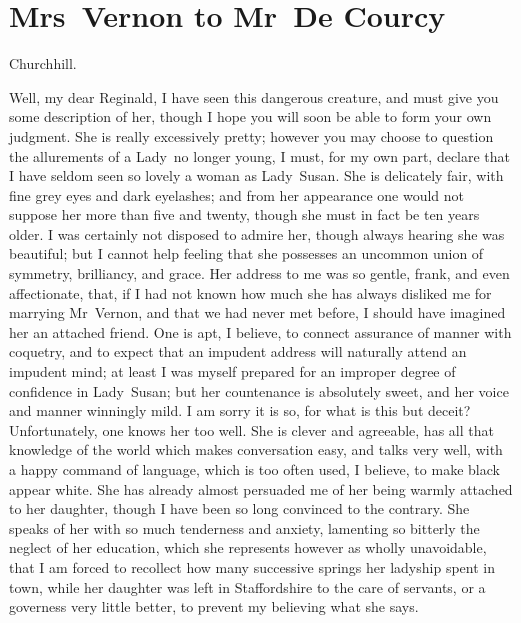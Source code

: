 \chapter{Mrs~Vernon to Mr~De Courcy}
  
  \begin{mail}{Churchhill.}{}

Well, my dear Reginald, I have seen this dangerous creature, and must give you some description of her, though I hope you will soon be able to form your own judgment. She is really excessively pretty; however you may choose to question the allurements of a Lady~no longer young, I must, for my own part, declare that I have seldom seen so lovely a woman as Lady~Susan. She is delicately fair, with fine grey eyes and dark eyelashes; and from her appearance one would not suppose her more than five and twenty, though she must in fact be ten years older. I was certainly not disposed to admire her, though always hearing she was beautiful; but I cannot help feeling that she possesses an uncommon union of symmetry, brilliancy, and grace. Her address to me was so gentle, frank, and even affectionate, that, if I had not known how much she has always disliked me for marrying Mr~Vernon, and that we had never met before, I should have imagined her an attached friend. One is apt, I believe, to connect assurance of manner with coquetry, and to expect that an impudent address will naturally attend an impudent mind; at least I was myself prepared for an improper degree of confidence in Lady~Susan; but her countenance is absolutely sweet, and her voice and manner winningly mild. I am sorry it is so, for what is this but deceit? Unfortunately, one knows her too well. She is clever and agreeable, has all that knowledge of the world which makes conversation easy, and talks very well, with a happy command of language, which is too often used, I believe, to make black appear white. She has already almost persuaded me of her being warmly attached to her daughter, though I have been so long convinced to the contrary. She speaks of her with so much tenderness and anxiety, lamenting so bitterly the neglect of her education, which she represents however as wholly unavoidable, that I am forced to recollect how many successive springs her ladyship spent in town, while her daughter was left in Staffordshire to the care of servants, or a governess very little better, to prevent my believing what she says.


\end{mail}
